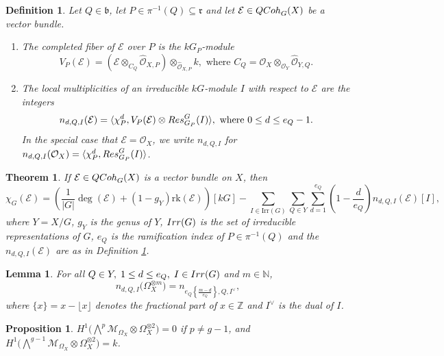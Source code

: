 \documentclass[10pt,a4paper]{amsart}
\newtheorem{definition}{Definition}
\newtheorem{theorem}{Theorem}
\newtheorem{lemma}{Lemma}
\newtheorem{proposition}{Proposition}
\begin{document}
\begin{definition}\label{def:localmult}
Let $Q\in \mathfrak{b}$, let $P\in\pi^{-1}(Q)\subseteq\mathfrak{r}$ and let $\mathcal{E}\in{\rm QCoh}_G(X)$ be a vector bundle. 
\begin{enumerate}
\item The completed fiber of $\mathcal{E}$ over $P$ is the $kG_P$-module
\[
V_{P}(\mathcal{E})=(\mathcal{E}\otimes_{C_Q}\widehat{\mathcal{O}}_{X,P})\otimes_{\widehat{\mathcal{O}}_{X,P}} k,
\text{ where }
C_Q=\mathcal{O}_X\otimes_{\mathcal{O}_Y}\widehat{\mathcal{O}}_{Y,Q}.
\]
\item The local multiplicities of an irreducible $kG$-module $I$ with respect to $\mathcal{E}$ are the integers
\[
n_{d,Q,I}(\mathcal{E})=\langle \chi_P^d, V_P(\mathcal{E})\otimes {\rm Res}^G_{G_P}(I)\rangle,
\text{ where }
0\leq d\leq e_Q-1.
\]
In the special case that $\mathcal{E}=\mathcal{O}_X$, we write $n_{d,Q,I}$ for $n_{d,Q,I}(\mathcal{O}_X)=\langle \chi_P^d, {\rm Res}^G_{G_P}(I)\rangle$.
\end{enumerate}
\end{definition}

\begin{theorem} \label{th:EL}
If $\mathcal{E}\in{\rm QCoh}_G(X)$ is a vector bundle on $X$, then
\[
\chi_G(\mathcal{E})
=
  \left( 
\frac{1}{|G|} \deg(\mathcal{E})+(1-g_Y) \mathrm{rk}(\mathcal{E})
  \right)[kG]
  - 
  \sum_{I \in \mathrm{Irr}(G)} 
  \sum_{Q\in Y}
  \sum_{d=1}^{e_Q}
\left(
1 -\frac{d}{e_Q}
\right)
n_{d,Q,I}(\mathcal{E}) [I],
\]
where $Y=X/G$, $g_Y$ is the genus of $Y$, ${\rm Irr}(G)$ is the set of irreducible representations of $G$, $e_Q$ is the ramification index of $P\in\pi^{-1}(Q)$ and the $n_{d,Q,I}(\mathcal{E})$ are as in Definition \ref{def:localmult}. 
\end{theorem}

\begin{lemma}\label{lem:nomega}
For all $Q\in Y,\;1\leq d\leq e_Q,\; I\in{\rm Irr}(G)$ and $m\in\mathbb{N}$,
\[
n_{d,Q,I}\big(\Omega_X^{\otimes m}\big)=n_{e_Q\left\{\frac{m-d}{e_Q}\right\},Q,I^\vee},
\]
where $\{ x\}=x-\lfloor x \rfloor$ denotes the fractional part of $x\in\mathbb{Z}$ and $I^\vee$ is the dual of $I$.
\end{lemma}

\begin{proposition}\label{prop:vanish}
$
H^1\big(\bigwedge^p\mathcal{M}_{\Omega_X}\otimes \Omega_X^{\otimes 2}\big)=0
$ if $p\neq g-1$, and $
H^1\big(\bigwedge^{g-1}\mathcal{M}_{\Omega_X}\otimes \Omega_X^{\otimes 2}\big)=k
$.
\end{proposition}
\end{document}

